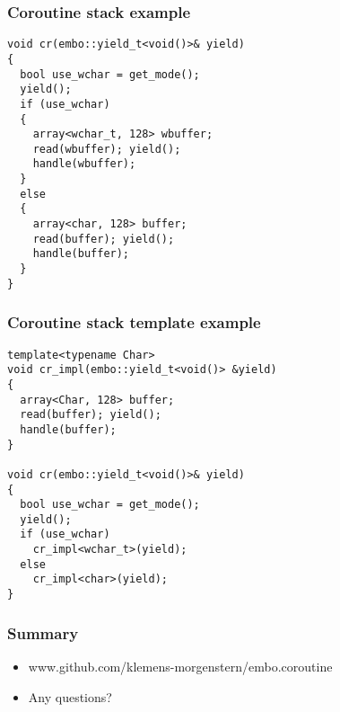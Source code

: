 \documentclass{beamer}
\begin{document}
\begin{frame}[fragile]
\frametitle{Coroutine stack example}
\vspace*{-3ex}

\begin{block}{\vspace*{-3.2ex}}
\begin{lstlisting}[basicstyle=\small]
void cr(embo::yield_t<void()>& yield)
{
  bool use_wchar = get_mode();
  yield();
  if (use_wchar)
  {
    array<wchar_t, 128> wbuffer;
    read(wbuffer); yield();
    handle(wbuffer);
  }
  else
  {
    array<char, 128> buffer;
    read(buffer); yield();
    handle(buffer);
  }
}
\end{lstlisting}
\end{block}
\end{frame}

\begin{frame}[fragile]
\frametitle{Coroutine stack template example}
\vspace*{-3ex}
\begin{block}{\vspace*{-3.2ex}}
\begin{lstlisting}[basicstyle=\small]
template<typename Char>
void cr_impl(embo::yield_t<void()> &yield)
{
  array<Char, 128> buffer;
  read(buffer); yield();
  handle(buffer);
}

void cr(embo::yield_t<void()>& yield)
{
  bool use_wchar = get_mode();
  yield();
  if (use_wchar)
    cr_impl<wchar_t>(yield);
  else
    cr_impl<char>(yield);
}
\end{lstlisting}
\end{block}
\end{frame}

\begin{frame}
\frametitle{Summary}
\begin{itemize}
\item<1-> www.github.com/klemens-morgenstern/embo.coroutine
\item<2-> Any questions?
\end{itemize}

\end{frame}
\end{document}
